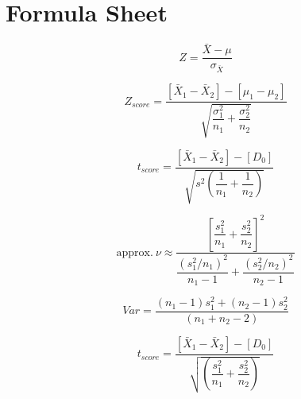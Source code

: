 \documentclass[11pt]{article}
\begin{document}
\section{Formula Sheet}
\begin{tcolorbox}[colback=qcolor!5, colframe=qcolor, title=Formulae provided with the paper]

\[
Z = \frac{\bar{X}-\mu}{\sigma_{\bar{X}}}
\]

\[
Z_{score} = \frac{[\bar{X}_1-\bar{X}_2]-[\mu_1-\mu_2]}{\sqrt{\dfrac{\sigma_1^2}{n_1}+\dfrac{\sigma_2^2}{n_2}}}
\]

\[
t_{score} = \frac{[\bar{X}_1-\bar{X}_2]-[D_0]}{\sqrt{s^2\left(\dfrac{1}{n_1}+\dfrac{1}{n_2}\right)}}
\]

\[
\text{approx.}\ \nu \approx \frac{\left[\dfrac{s_1^2}{n_1}+\dfrac{s_2^2}{n_2}\right]^2}{\dfrac{\left(s_1^2/n_1\right)^2}{n_1-1}+\dfrac{\left(s_2^2/n_2\right)^2}{n_2-1}}
\]

\[
Var = \frac{(n_1-1)s_1^2+(n_2-1)s_2^2}{(n_1+n_2-2)}
\]

\[
t_{score} = \frac{[\bar{X}_1-\bar{X}_2]-[D_0]}{\sqrt{\left(\dfrac{s_1^2}{n_1}+\dfrac{s_2^2}{n_2}\right)}}
\]

\end{tcolorbox}
\end{document}
